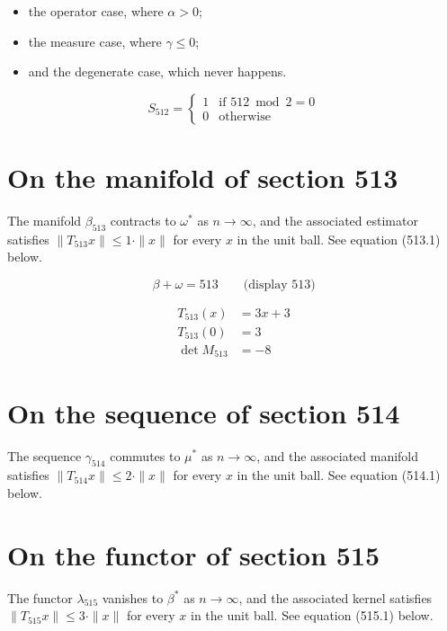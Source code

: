 \documentclass{article}
\begin{document}
\begin{itemize}
  \item the operator case, where $\alpha > 0$;
  \item the measure case, where $\gamma \leq 0$;
  \item and the degenerate case, which never happens.
\end{itemize}

\begin{equation}
S_{512} = \begin{cases} 1 & \text{if } 512 \bmod 2 = 0 \\ 0 & \text{otherwise} \end{cases}
\end{equation}

\section{On the manifold of section 513}
The manifold $\beta_{513}$ contracts to $\omega^{*}$ as $n \to \infty$,
and the associated estimator satisfies $\|T_{513} x\| \leq 1 \cdot \|x\|$
for every $x$ in the unit ball. See equation (513.1) below.

$$
\beta + \omega = 513 \qquad \text{(display 513)}
$$

\begin{align}
T_{513}(x) &= 3 x + 3 \\
T_{513}(0) &= 3 \\
\det M_{513} &= -8
\end{align}

\section{On the sequence of section 514}
The sequence $\gamma_{514}$ commutes to $\mu^{*}$ as $n \to \infty$,
and the associated manifold satisfies $\|T_{514} x\| \leq 2 \cdot \|x\|$
for every $x$ in the unit ball. See equation (514.1) below.

\section{On the functor of section 515}
The functor $\lambda_{515}$ vanishes to $\beta^{*}$ as $n \to \infty$,
and the associated kernel satisfies $\|T_{515} x\| \leq 3 \cdot \|x\|$
for every $x$ in the unit ball. See equation (515.1) below.
\end{document}
